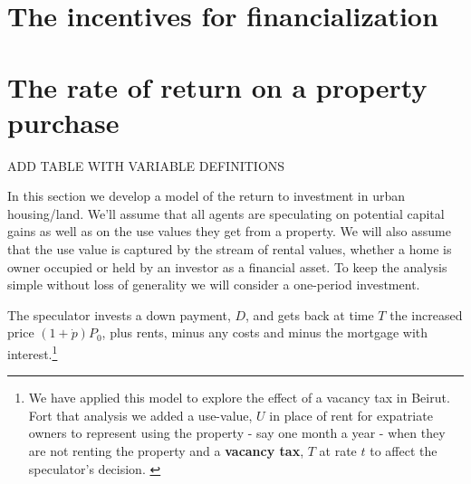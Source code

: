 \section{The incentives for financialization}%

  





\section{The rate of return on a property purchase}


ADD TABLE WITH VARIABLE DEFINITIONS
 
 In this section we develop a model of the return to investment in urban housing/land. We'll assume that all agents are speculating on potential capital gains as well as on the use values they get from a property.  We will also assume that the use value is captured by the stream of rental values, whether a home is owner occupied or  held by an investor as a financial asset. To keep the analysis simple without loss of generality we will consider a one-period investment.
 
 The speculator  invests a down payment, $D$, and gets back at time $T$ the  increased price $(1+\dot p)P_0$, plus rents, minus any costs and minus the mortgage with interest.\footnote{We have applied this model to explore the effect of a vacancy tax in Beirut.  Fort that analysis we  added a use-value, $U$ in place of rent for expatriate owners to represent using the property - say one month a year - when they are not renting the property and a \textbf{vacancy tax}, $T$ at rate $t$ to affect the speculator's  decision. \cite{Al-Shihabi}}


